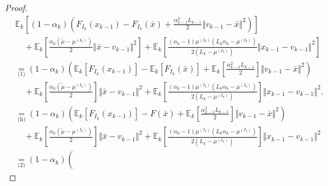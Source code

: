 \documentclass[12pt]{article}
\begin{document}
\begin{proof}
{\begin{align*}
                & \mathbb E_k\left[
                    (1 - \alpha_k)\left(
                        F_{I_k}(x_{k - 1}) - F_{I_k}(\bar x) + \frac{\alpha_{k - 1}^2L_{k - 1}}{2}\Vert v_{k - 1} - \bar x\Vert^2
                    \right)
                \right]
                    \\ &\quad 
                    + \mathbb E_k \left[
                        \frac{\alpha_k(\tilde\mu - \mu^{(I_k)})}{2} \Vert \bar x - v_{k - 1}\Vert^2
                    \right]
                    + \mathbb E_k\left[
                        \frac{(\alpha_k - 1)\mu^{(I_k)}\left(L_k\alpha_k - \mu^{(I_k)}\right)}{2\left(L_k - \mu^{(I_k)}\right)}\Vert x_{k - 1} - v_{k - 1} \Vert^2
                    \right]
                \\
                &\underset{\text{(1)}}{=} 
                (1 - \alpha_k)\left(
                        \mathbb E_k \left[F_{I_k}(x_{k - 1})\right] 
                        -\mathbb E_k [F_{I_k}(\bar x)] 
                        + \mathbb E_k \left[\frac{\alpha_{k - 1}^2L_{k - 1}}{2}\right]\Vert v_{k - 1} - \bar x\Vert^2
                \right)
                    \\ &\quad 
                    + \mathbb E_k \left[
                        \frac{\alpha_k(\tilde\mu - \mu^{(I_k)})}{2} 
                    \right]\Vert \bar x - v_{k - 1}\Vert^2
                    + \mathbb E_k\left[
                        \frac{(\alpha_k - 1)\mu^{(I_k)}\left(L_k\alpha_k - \mu^{(I_k)}\right)}{2\left(L_k - \mu^{(I_k)}\right)}
                    \right]\Vert x_{k - 1} - v_{k - 1} \Vert^2. 
                \\
                &\underset{\text{(h)}}{=} 
                (1 - \alpha_k)\left(
                        \mathbb E_k \left[F_{I_k}(x_{k - 1})\right] 
                        - F(\bar x)
                        + \mathbb E_k \left[\frac{\alpha_{k - 1}^2L_{k - 1}}{2}\right]\Vert v_{k - 1} - \bar x\Vert^2
                \right)
                    \\ &\quad 
                    + \mathbb E_k \left[
                        \frac{\alpha_k(\tilde\mu - \mu^{(I_k)})}{2} 
                    \right]\Vert \bar x - v_{k - 1}\Vert^2
                    + \mathbb E_k\left[
                        \frac{(\alpha_k - 1)\mu^{(I_k)}\left(L_k\alpha_k - \mu^{(I_k)}\right)}{2\left(L_k - \mu^{(I_k)}\right)}
                    \right]\Vert x_{k - 1} - v_{k - 1} \Vert^2
                \\
                &\underset{\text{(2)}}{=}
                (1 - \alpha_k)\left(

\end{align*}}
\end{proof}
\end{document}
